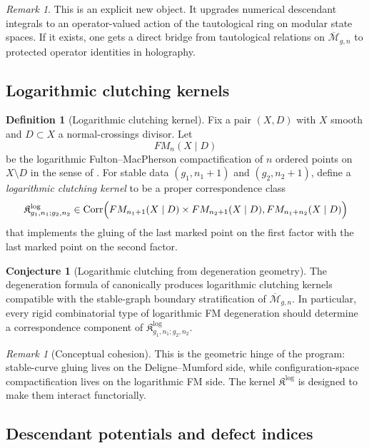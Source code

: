 \documentclass[11pt]{article}
\theoremstyle{definition}
\newtheorem{definition}[theorem]{Definition}
\newtheorem{conjecture}[theorem]{Conjecture}
\theoremstyle{remark}
\newtheorem{remark}[theorem]{Remark}
\newcommand{\Kk}{\mathfrak K}
\newcommand{\M}{\mathcal M}
\begin{document}
\begin{remark}
This is an explicit new object. It upgrades numerical descendant integrals to an operator-valued action of the tautological ring on modular state spaces. If it exists, one gets a direct bridge from tautological relations on $\overline{\M}_{g,n}$ to protected operator identities in holography.
\end{remark}

\subsection{Logarithmic clutching kernels}

\begin{definition}[Logarithmic clutching kernel]\label{def:log-clutching-kernel}
Fix a pair $(X,D)$ with $X$ smooth and $D\subset X$ a normal-crossings divisor. Let
\[
FM_n(X\mid D)
\]
be the logarithmic Fulton--MacPherson compactification of $n$ ordered points on $X\setminus D$ in the sense of \cite{Mok2025}. For stable data $(g_1,n_1+1)$ and $(g_2,n_2+1)$, define a \emph{logarithmic clutching kernel} to be a proper correspondence class
\[
\Kk^{\log}_{g_1,n_1;g_2,n_2}
\in
\mathrm{Corr}\Bigl(
FM_{n_1+1}(X\mid D)\times FM_{n_2+1}(X\mid D),
FM_{n_1+n_2}(X\mid D)
\Bigr)
\]
that implements the gluing of the last marked point on the first factor with the last marked point on the second factor.
\end{definition}

\begin{conjecture}[Logarithmic clutching from degeneration geometry]\label{conj:log-clutching}
The degeneration formula of \cite{Mok2025} canonically produces logarithmic clutching kernels compatible with the stable-graph boundary stratification of $\overline{\M}_{g,n}$. In particular, every rigid combinatorial type of logarithmic FM degeneration should determine a correspondence component of $\Kk^{\log}_{g_1,n_1;g_2,n_2}$.
\end{conjecture}

\begin{remark}[Conceptual cohesion]
This is the geometric hinge of the program: stable-curve gluing lives on the Deligne--Mumford side, while configuration-space compactification lives on the logarithmic FM side. The kernel $\Kk^{\log}$ is designed to make them interact functorially.
\end{remark}

\subsection{Descendant potentials and defect indices}
\end{document}
